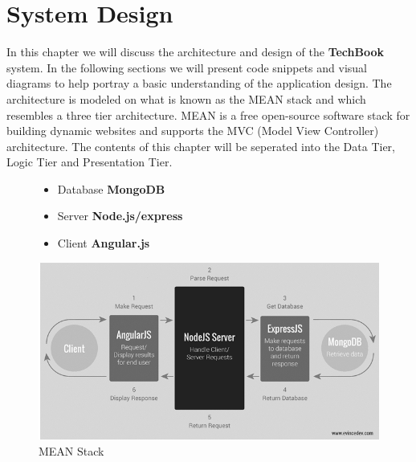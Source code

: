 \chapter{System Design}
In this chapter we will discuss the architecture and design of the \textbf{TechBook} system. In the following sections we will present code snippets and visual diagrams to help portray a basic understanding of the application design. The architecture is modeled on what is known as the MEAN stack and which resembles a three tier architecture. MEAN is a free open-source software stack for building dynamic websites and supports the MVC (Model View Controller) architecture. The contents of this chapter will be seperated into the Data Tier, Logic Tier and Presentation Tier.




\begin{figure}[H]
\begin{minipage}{.5\textwidth}  %
\lstset{linewidth = 4cm, breaklines=true} %
\begin{itemize}
\item Database \textbf{MongoDB}
\item Server \textbf{Node.js/express}
\item Client \textbf{Angular.js}
\end{itemize}

\end{minipage}
\qquad %
\begin{minipage}{0.4\textwidth} %
\includegraphics[scale=.4]{img/mvc.png} %
\caption{MEAN Stack}
\end{minipage}
\end{figure}

